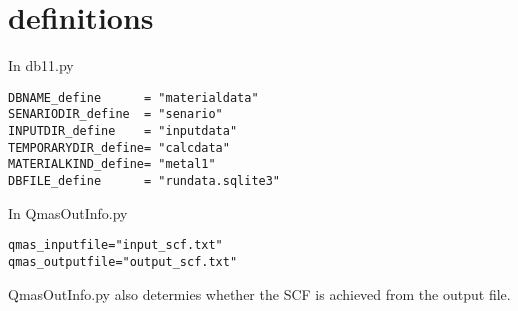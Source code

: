 \documentclass[a4paper]{article}
\begin{document}
\appendix
\section{definitions}

In db11.py
\begin{verbatim}
DBNAME_define      = "materialdata"
SENARIODIR_define  = "senario"
INPUTDIR_define    = "inputdata"
TEMPORARYDIR_define= "calcdata"
MATERIALKIND_define= "metal1"
DBFILE_define      = "rundata.sqlite3"
\end{verbatim}

In QmasOutInfo.py
\begin{verbatim}
qmas_inputfile="input_scf.txt"
qmas_outputfile="output_scf.txt"
\end{verbatim}
QmasOutInfo.py also determies whether the SCF is achieved from the output file.
\end{document}
